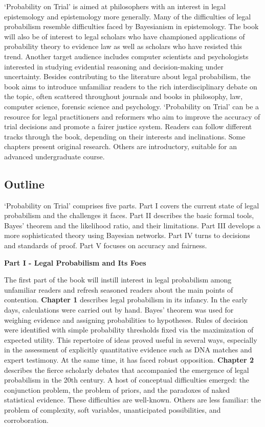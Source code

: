 \documentclass[
  10pt,
  dvipsnames,enabledeprecatedfontcommands]{scrartcl}
\begin{document}
`Probability on Trial' is aimed at philosophers with an interest in
legal epistemology and epistemology more generally. Many of the
difficulties of legal probabilism resemble difficulties faced by
Bayesianism in epistemology. The book will also be of interest to legal
scholars who have championed applications of probability theory to
evidence law as well as scholars who have resisted this trend. Another
target audience includes computer scientists and psychologists
interested in studying evidential reasoning and decision-making under
uncertainty. Besides contributing to the literature about legal
probabilism, the book aims to introduce unfamiliar readers to the rich
interdisciplinary debate on the topic, often scattered throughout
journals and books in philosophy, law, computer science, forensic
science and psychology. `Probability on Trial' can be a resource for
legal practitioners and reformers who aim to improve the accuracy of
trial decisions and promote a fairer justice system. Readers can follow
different tracks through the book, depending on their interests and
inclinations. Some chapters present original research. Others are
introductory, suitable for an advanced undergraduate course.

\hypertarget{outline}{%
\subsection{Outline}\label{outline}}

`Probability on Trial' comprises five parts. Part I covers the current
state of legal probabilism and the challenges it faces. Part II
describes the basic formal tools, Bayes' theorem and the likelihood
ratio, and their limitations. Part III develops a more sophisticated
theory using Bayesian networks. Part IV turns to decisions and standards
of proof. Part V focuses on accuracy and fairness.

\vspace{2mm}

\noindent \textbf{Part I - Legal Probabilism and Its Foes}

\noindent The first part of the book will instill interest in legal
probabilism among unfamiliar readers and refresh seasoned readers about
the main points of contention. \textbf{Chapter 1} describes legal
probabilism in its infancy. In the early days, calculations were carried
out by hand. Bayes' theorem was used for weighing evidence and assigning
probabilities to hypotheses. Rules of decision were identified with
simple probability thresholds fixed via the maximization of expected
utility. This repertoire of ideas proved useful in several ways,
especially in the assessment of explicitly quantitative evidence such as
DNA matches and expert testimony. At the same time, it has faced robust
opposition. \textbf{Chapter 2} describes the fierce scholarly debates
that accompanied the emergence of legal probabilism in the 20th century.
A host of conceptual difficulties emerged: the conjunction problem, the
problem of priors, and the paradoxes of naked statistical evidence.
These difficulties are well-known. Others are less familiar: the problem
of complexity, soft variables, unanticipated possibilities, and
corroboration.
\end{document}
